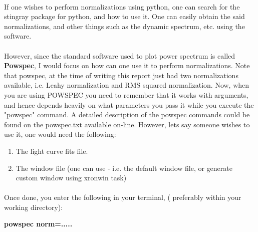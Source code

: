 \documentclass[a4paper,twoside]{report}
\numberwithin{equation}{section}
\begin{document}
\paragraph{}
If one wishes to perform normalizations using python, one can search for the stingray package for python, and how to use it. One can easily obtain the said normalizations, and other things such as the dynamic spectrum, etc. using the software. 
\paragraph{}
However, since the standard software used to plot power spectrum is called \textbf{Powspec}, I would focus on how can one use it to perform normalizations. Note that powspec, at the time of writing this report just had two normalizations available, i.e. Leahy normalization and RMS squared normalization. Now, when you are using POWSPEC you need to remember that it works with arguments, and hence depends heavily on what parameters you pass it while you execute the "powspec" command. A detailed description of the powspec commands could be found on the powspec.txt available on-line. However, lets say someone wishes to use it, one would need the following: 
\begin{enumerate}
\item The light curve fits file. 
\item The window file (one can use - i.e. the default window file, or generate custom window using xronwin task)
\end{enumerate}
\paragraph{}
Once done, you enter the following in your terminal, ( preferably within your working directory):
\begin{center}
\textbf{powspec norm=.....}
\end{center}
\end{document}
